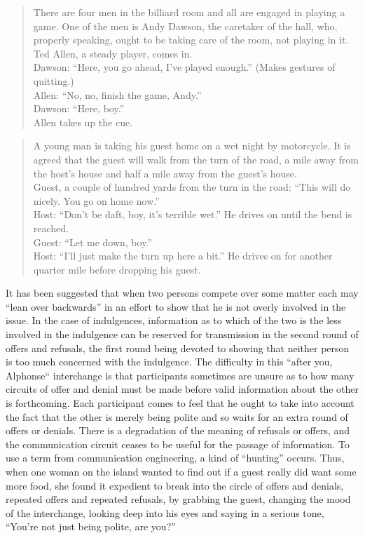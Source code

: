 \documentclass[twoside,symmetric,nobib,justified]{tufte-book}
\begin{document}
\begin{quote}
There are four men in the billiard room and all are engaged in playing a
game. One of the men is Andy Dawson, the caretaker of the hall, who,
properly speaking, ought to be taking care of the room, not playing in
it. Ted Allen, a steady player, comes in.\\
Dawson: ``Here, you go ahead, I've played enough.'' (Makes gestures of
quitting.)\\
Allen: ``No, no, finish the game, Andy.''\\
Dawson: ``Here, boy.''\\
Allen takes up the cue.
\end{quote}

\begin{quote}
A young man is taking his guest home on a wet night by motorcycle. It is
agreed that the guest will walk from the turn of the road, a mile away
from the host's house and half a mile away from the guest's house.\\
Guest, a couple of hundred yards from the turn in the road: ``This will
do nicely. You go on home now.''\\
Host: ``Don't be daft, boy, it's terrible wet.'' He drives on until the
bend is reached.\\
Guest: ``Let me down, boy.''\\
Host: ``I'll just make the turn up here a bit.'' He drives on for
another quarter mile before dropping his guest.
\end{quote}

\newpage It has been suggested that when two persons compete over some matter
each may ``lean over backwards'' in an effort to show that he is not
overly involved in the issue. In the case of indulgences, information as
to which of the two is the less involved in the indulgence can be
reserved for transmission in the second round of offers and refusals,
the first round being devoted to showing that neither person is too much
concerned with the indulgence. The difficulty in this ``after you,
Alphonse`` interchange is that participants sometimes are unsure as to
how many circuits of offer and denial must be made before valid
information about the other is forthcoming. Each participant comes to
feel that he ought to take into account the fact that the other is
merely being polite and so waits for an extra round of offers or
denials. There is a degradation of the meaning of refusals or offers,
and the communication circuit ceases to be useful for the passage of
information. To use a term from communication engineering, a kind of
``hunting'' occurs. Thus, when one woman on the island wanted to find
out if a guest really did want some more food, she found it expedient to
break into the circle of offers and denials, repeated offers and
repeated refusals, by grabbing the guest, changing the mood of the
interchange, looking deep into his eyes and saying in a serious tone,
``You're not just being polite, are you?''
\end{document}
